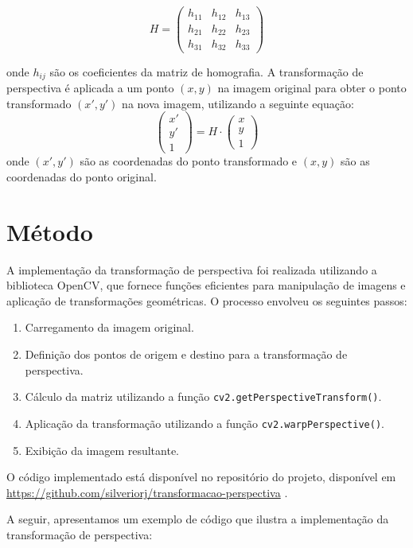 \documentclass[sigconf,nonacm]{acmart}
\begin{document}
\[
H = \begin{pmatrix}
h_{11} & h_{12} & h_{13} \\
h_{21} & h_{22} & h_{23} \\
h_{31} & h_{32} & h_{33}
\end{pmatrix}
\]

onde \(h_{ij}\) são os coeficientes da matriz de homografia. 
A transformação de perspectiva é aplicada a um ponto \((x, y)\) na imagem original para obter o ponto transformado \((x', y')\) na nova imagem, utilizando a seguinte equação:
\[
\begin{pmatrix}
x' \\
y' \\ 1
\end{pmatrix}
=
H \cdot
\begin{pmatrix}
x \\
y \\ 1
\end{pmatrix}
\]
onde \((x', y')\) são as coordenadas do ponto transformado e \((x, y)\) são as coordenadas do ponto original.


\section{Método}
A implementação da transformação de perspectiva foi realizada utilizando a biblioteca OpenCV, que fornece funções eficientes para manipulação de imagens e aplicação de transformações geométricas. O processo envolveu os seguintes passos:
\begin{enumerate}
    \item Carregamento da imagem original.
    \item Definição dos pontos de origem e destino para a transformação de perspectiva.
    \item Cálculo da matriz utilizando a função \texttt{cv2.getPerspectiveTransform()}.
    \item Aplicação da transformação utilizando a função \texttt{cv2.warpPerspective()}.
    \item Exibição da imagem resultante.
\end{enumerate}


O código implementado está disponível no repositório do projeto, disponível em \url{https://github.com/silveriorj/transformacao-perspectiva} \cite{github_ta03_repository}.

A seguir, apresentamos um exemplo de código que ilustra a implementação da transformação de perspectiva:
\end{document}
